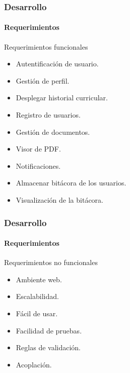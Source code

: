 \documentclass{beamer}
\begin{document}
\begin{frame}
\frametitle{Desarrollo}
\framesubtitle{Requerimientos}

    \begin{block}{Requerimientos funcionales}
    	\begin{itemize}
    		\item<1-> Autentificación de usuario.
    		\item<2-> Gestión de perfil.
    		\item<3-|alert@10> Desplegar historial curricular.
    		\item<4-> Registro de usuarios.
    		\item<5-|alert@10> Gestión de documentos.
    		\item<6-> Visor de PDF.
    		\item<7-> Notificaciones.
    		\item<8-> Almacenar bitácora de los usuarios.
    		\item<9-> Visualización de la bitácora.
    		
    	\end{itemize}
	\end{block}     
\end{frame}

\begin{frame}
\frametitle{Desarrollo}
\framesubtitle{Requerimientos}

    \begin{block}{Requerimientos no  funcionales}
    	\begin{itemize}
    		\item<1-> Ambiente web.
    		\item<2-> Escalabilidad.
    		\item<3-> Fácil de usar.
    		\item<4-> Facilidad de pruebas.
    		\item<5-> Reglas de validación.
    		\item<6-> Acoplación.
    		
    	\end{itemize}
	\end{block}     
\end{frame}



\end{document}
